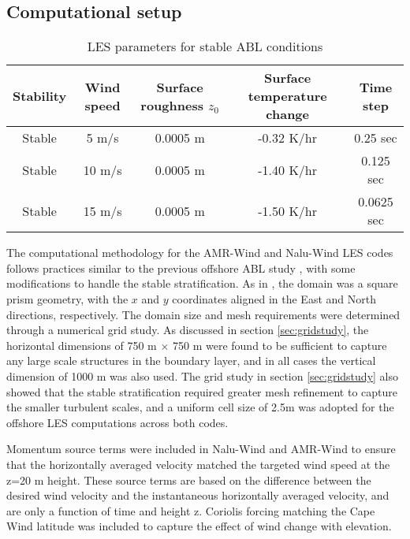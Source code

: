 
\subsection{\label{sec:CFDsetup}Computational setup}

\begin{table}
\caption{\label{tab:z0tempparam} LES parameters for stable ABL conditions}
\centering
\begin{tabular}{ccccc}
  \hline
  Stability & Wind speed & Surface roughness $z_0$ & Surface
  temperature change & Time step\\
  \hline
  Stable       & 5  m/s           & 0.0005 m       & -0.32 K/hr   & 0.25 sec   \\
  Stable       & 10 m/s           & 0.0005 m       & -1.40 K/hr   & 0.125 sec  \\
  Stable       & 15 m/s           & 0.0005 m       & -1.50 K/hr   & 0.0625 sec \\
\hline
\end{tabular}
\end{table}

The computational methodology for the AMR-Wind and Nalu-Wind LES codes
follows practices similar to the previous offshore ABL study \cite{cheung2020large}, with
some modifications to handle the stable stratification.  As in
\cite{cheung2020large}, the domain was a square prism geometry, with
the $x$ and $y$ coordinates aligned in the East and North directions,
respectively.  The domain size and mesh requirements were determined
through a numerical grid study.  As discussed in section
\ref{sec:gridstudy}, the horizontal dimensions of 750 m $\times$ 750 m
were found to be sufficient to capture any large scale structures in
the boundary layer, and in all cases the vertical dimension of 1000 m
was also used.  The grid study in section \ref{sec:gridstudy} also
showed that the stable stratification required greater mesh refinement
to capture the smaller turbulent scales, and a uniform cell size of
2.5m was adopted for the offshore LES computations across both codes.

Momentum source terms were included in Nalu-Wind and AMR-Wind to
ensure that the horizontally averaged velocity matched the targeted
wind speed at the z=20 m height.  These source terms are based on the
difference between the desired wind velocity and the instantaneous
horizontally averaged velocity, and are only a function of time and
height z.  Coriolis forcing matching the Cape Wind latitude was
included to capture the effect of wind change with elevation.

